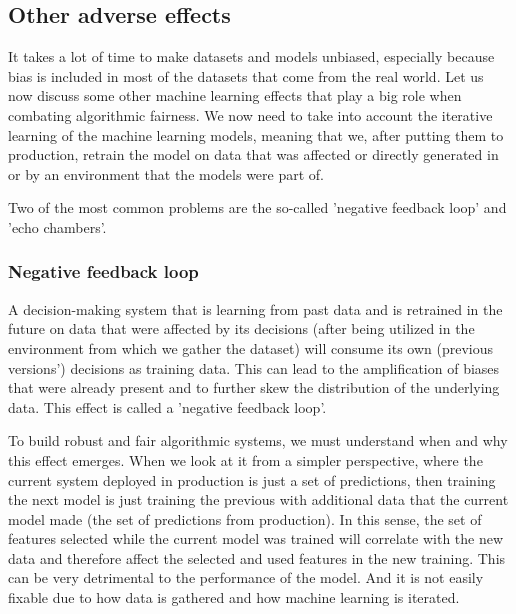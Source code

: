 \subsection{Other adverse effects}

It takes a lot of time to make datasets and models unbiased, especially because bias is included in most of the  datasets that come from the real world. Let us now discuss some other machine learning effects that play a big role when combating algorithmic fairness. We now need to take into account the iterative learning of the machine learning models, meaning that we, after putting them to production, retrain the model on data that was affected or directly generated in or by an environment that the models were part of.

Two of the most common problems are the so-called 'negative feedback loop' and 'echo chambers'. 

\subsubsection{Negative feedback loop}\label{subsubsec:02_algo_fairness.adverse_effects.nfl}

A decision-making system that is learning from past data and is retrained in the future on data that were affected by its decisions  (after being utilized in the environment from which we gather the dataset) will consume its own (previous versions') decisions as training data. This can lead to the amplification of biases that were already present and to further skew the distribution of the underlying data. This effect is called a 'negative feedback loop'. 


To build robust and fair algorithmic systems, we must understand when and why this effect emerges. When we look at it from a simpler perspective, where the current system deployed in production is just a set of predictions, then training the next model is just training the previous with additional data that the current model made (the set of predictions from production). In this sense, the set of features selected while the current model was trained will correlate with the new data and therefore affect the selected and used features in the new training. This can be very detrimental to the performance of the model. And it is not easily fixable due to how data is gathered and how machine learning is iterated.

